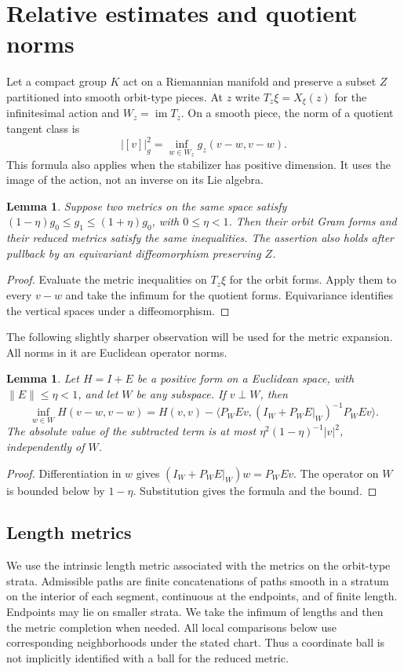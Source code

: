 \documentclass[11pt]{amsart}
\newtheorem{lemma}[theorem]{Lemma}
\theoremstyle{definition}
\theoremstyle{remark}
\newcommand{\im}{\operatorname{im}}
\newcommand{\ip}[2]{\langle #1,#2\rangle}
\newcommand{\norm}[1]{\lVert #1\rVert}
\begin{document}
\section{Relative estimates and quotient norms}\label{sec:linear}

Let a compact group $K$ act on a Riemannian manifold and preserve a
subset $Z$ partitioned into smooth orbit-type pieces. At $z$ write
$T_z\xi=X_\xi(z)$ for the infinitesimal action and
$W_z=\im T_z$. On a smooth piece, the norm of a quotient tangent
class is
\begin{equation}\label{eq:quotientnorm}
 |[v]|_g^2=\inf_{w\in W_z}g_z(v-w,v-w).
\end{equation}
This formula also applies when the stabilizer has positive dimension.
It uses the image of the action, not an inverse on its Lie algebra.

\begin{lemma}\label{lem:relative}
Suppose two metrics on the same space satisfy
$(1-\eta)g_0\leq g_1\leq(1+\eta)g_0$, with $0\leq\eta<1$.
Then their orbit Gram forms and their reduced metrics satisfy the
same inequalities. The assertion also holds after pullback by an
equivariant diffeomorphism preserving $Z$.
\end{lemma}
\begin{proof}
Evaluate the metric inequalities on $T_z\xi$ for the orbit forms.
Apply them to every $v-w$ and take the infimum for the quotient forms.
Equivariance identifies the vertical spaces under a diffeomorphism.
\end{proof}

The following slightly sharper observation will be used for the metric
expansion. All norms in it are Euclidean operator norms.

\begin{lemma}\label{lem:residual}
Let $H=I+E$ be a positive form on a Euclidean space, with
$\norm E\leq\eta<1$, and let $W$ be any subspace. If $v\perp W$,
then
\[
 \inf_{w\in W}H(v-w,v-w)
 =H(v,v)-\ip{P_WE v}{(I_W+P_WE|_W)^{-1}P_WE v}.
\]
The absolute value of the subtracted term is at most
$\eta^2(1-\eta)^{-1}|v|^2$, independently of $W$.
\end{lemma}
\begin{proof}
Differentiation in $w$ gives
$(I_W+P_WE|_W)w=P_WE v$. The operator on $W$ is bounded below
by $1-\eta$. Substitution gives the formula and the bound.
\end{proof}

\subsection{Length metrics}
We use the intrinsic length metric associated with the metrics on the
orbit-type strata. Admissible paths are finite concatenations of paths
smooth in a stratum on the interior of each segment, continuous at the
endpoints, and of finite length. Endpoints may lie on smaller strata.
We take the infimum of lengths and then the metric completion when
needed. All local comparisons below use corresponding neighborhoods
under the stated chart. Thus a coordinate ball is not implicitly
identified with a ball for the reduced metric.
\end{document}
